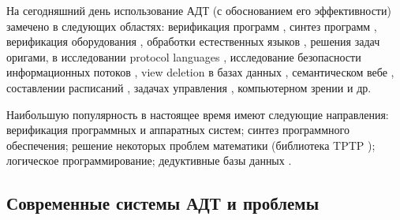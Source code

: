На сегодняшний день использование АДТ (с обоснованием его эффективности) замечено в следующих областях: верификация программ \cite{promsky,ATP_Ver2,keyproj}, синтез программ \cite{Butakov1}, верификация оборудования \cite{hardver,ACL2}, обработки естественных языков \cite{ATP_NLP}, решения задач оригами\cite{Origami}, в исследовании protocol languages \cite{protolan}, исследование безопасности информационных потоков \cite{ATP_Flow}, view deletion в базах данных \cite{ATP_DB}, семантическом вебе \cite{semweb,tptp}, составлении расписаний \cite{tptp}, задачах управления \cite{ICDS2000}, компьютерном зрении \cite{ATP_Vision} и др.

Наибольшую популярность в настоящее время имеют следующие направления: верификация программных и аппаратных систем; синтез программного обеспечения; решение некоторых проблем математики (библиотека TPTP \cite{tptp}); логическое программирование; дедуктивные базы данных \cite{ontobox}.

\subsection{Современные системы АДТ и проблемы}

